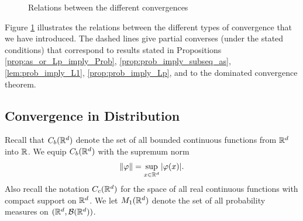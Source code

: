 \documentclass[../Main.tex]{subfiles}
\begin{document}
\begin{figure}[h]
\centering

\caption{Relations between the different convergences} \label{fig:relationshipsConv}
\end{figure}


Figure \ref{fig:relationshipsConv} illustrates the relations between the different types of convergence that we have introduced. The dashed lines give partial converses (under the stated conditions) that correspond to results stated in Propositions \ref{prop:as_or_Lp_imply_Prob}, \ref{prop:prob_imply_subseq_as}, \ref{lem:prob_imply_L1}, \ref{prop:prob_imply_Lp}, and to the dominated convergence theorem.


\subsection{Convergence in Distribution}
Recall that $C_b(\mathbb{R}^d)$ denote the set of all bounded continuous functions from $\mathbb{R}^d$ into $\mathbb{R}$. We equip $C_b(\mathbb{R}^d)$ with the supremum norm 
\[ \|\varphi\|=\sup_{x\in\mathbb{R}^d}|\varphi(x)|. \]
Also recall the notation $C_c(\mathbb{R}^d)$ for the space of all real continuous functions with compact support on $\mathbb{R}^d$.
We let $M_1(\mathbb{R}^d)$ denote the set of all probability measures on $(\mathbb{R}^d,\mathcal{B}(\mathbb{R}^d))$.

\end{document}
